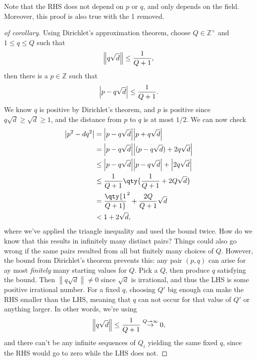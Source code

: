 \begin{remark}

Note that the RHS does not depend on \(p\) or \(q\), and only depends on
the field. Moreover, this proof is also true with the 1 removed.

\end{remark}

\begin{proof}[of corollary]

Using Dirichlet's approximation theorem, choose \(Q \in {\mathbb{Z}}^+\)
and \(1\leq q\leq Q\) such that
\begin{align*}
{\left\lVert { q \sqrt{d} } \right\rVert} \leq {1 \over Q+1}
,\end{align*}
then there is a \(p \in {\mathbb{Z}}\) such that
\begin{align*}
{\left\lvert { p - q \sqrt{d} } \right\rvert} \leq {1 \over Q+1}
.\end{align*}
We know \(q\) is positive by Dirichlet's theorem, and \(p\) is positive
since \(q\sqrt{d} \geq \sqrt{d} \geq 1\), and the distance from \(p\) to
\(q\) is at most \(1/2\). We can now check
\begin{align*}
{\left\lvert {p^2 - dq^2} \right\rvert} 
&= {\left\lvert {p - q \sqrt{d}} \right\rvert} {\left\lvert {p + q \sqrt{d}} \right\rvert}    \\
&= {\left\lvert {p - q \sqrt{d}} \right\rvert} {\left\lvert {(p- q \sqrt{d} ) + 2q \sqrt{d} } \right\rvert}    \\
&\leq {\left\lvert {p - q \sqrt{d}} \right\rvert} {\left\lvert {p- q \sqrt{d}} \right\rvert} + {\left\lvert {2q \sqrt{d} } \right\rvert}    \\
&\leq {1\over Q+1} \qty{ {1\over Q+1} + 2Q \sqrt{d} }\\
&= \qty{1\over Q+1}^2 + {2Q \over Q+1} \sqrt{d} \\
&< 1 + 2\sqrt{d}
,\end{align*}
where we've applied the triangle inequality and used the bound twice.
How do we know that this results in infinitely many distinct pairs?
Things could also go wrong if the same pairs resulted from all but
finitely many choices of \(Q\). However, the bound from Dirichlet's
theorem prevents this: any pair \((p, q)\) can arise for ay most
\emph{finitely} many starting values for \(Q\). Pick a \(Q\), then
produce \(q\) satisfying the bound. Then
\({\left\lVert { q \sqrt{d} } \right\rVert} \neq 0\) since \(\sqrt{d}\)
is irrational, and thus the LHS is some positive irrational number. For
a fixed \(q\), choosing \(Q'\) big enough can make the RHS smaller than
the LHS, meaning that \(q\) can not occur for that value of \(Q'\) or
anything larger. In other words, we're using
\begin{align*}
{\left\lVert { q \sqrt{d} } \right\rVert} \leq {1\over Q+1} \overset{Q \to \infty } \to 0
,\end{align*}
and there can't be any infinite sequences of \(Q_i\) yielding the same
fixed \(q\), since the RHS would go to zero while the LHS does not.

\end{proof}

